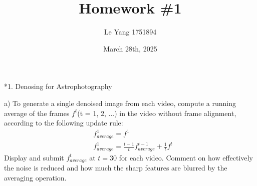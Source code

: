\documentclass[
	12pt, %
]{fphw}
\title{Homework \#1} %
\author{Le Yang 1751894} %
\date{March 28th, 2025} %
\institute{Tongji University \\ School of Software Engineering} %
\makeatletter
\renewcommand{\section}{\@startsection{section}{1}{0mm}
  {-\baselineskip}{0.5\baselineskip}{\bf\leftline}}
\makeatother
\begin{document}
\maketitle %


\section*{1. Denosing for Astrophotography}

\begin{problem}
	a) To generate a single denoised image from each video, compute a running average of the frames $f^t$(t = 1, 2, ...) in the video without frame alignment, according to the following update rule:
	\begin{align*}
		&f^1_{average}=f^1 \\
		&f^1_{average}=\frac{t-1}{t}f^{t-1}_{average}+\frac{1}{t}f^t
	\end{align*}
	Display and submit $f^t_{average}$ at $t=30$ for each video. Comment on how effectively the noise is reduced and how
	much the sharp features are blurred by the averaging operation. 
\end{problem}
\end{document}
